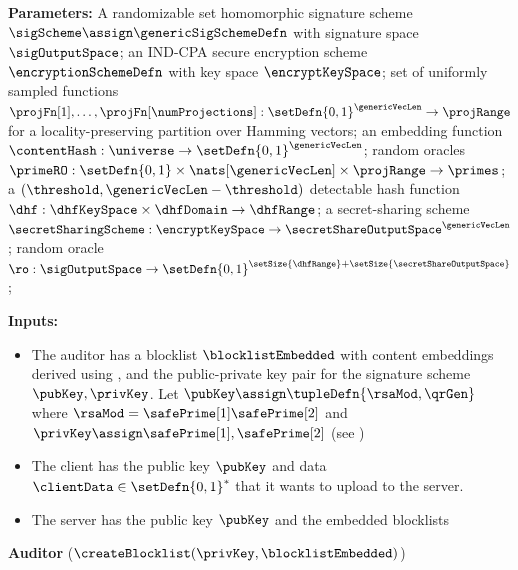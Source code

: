 \begin{mdframed}[frametitle={Protocol for Detecting Fuzzy Blocklist Matches}, 
frametitlealignment=\centering, 
font=\small]

	\smallskip\noindent\textbf{Parameters:} A randomizable set homomorphic signature 
	scheme 
$\sigScheme \assign \genericSigSchemeDefn$ with signature space $\sigOutputSpace$; an 
IND-CPA secure encryption scheme $\encryptionSchemeDefn$ with key space 
$\encryptKeySpace$; set of uniformly sampled functions $\projFn[1], \dots, 
\projFn[\numProjections]: \setDefn{0,1}^{\genericVecLen} \rightarrow \projRange$ for a 
locality-preserving partition over Hamming vectors; an embedding function 
$\contentHash: \universe \rightarrow \setDefn{0,1}^{\genericVecLen}$; 
random oracles $\primeRO: 
\setDefn{0,1} \times \nats[\genericVecLen] \times \projRange \rightarrow \primes$;  
a $(\threshold, \genericVecLen - \threshold)$ detectable hash 
function $\dhf: \dhfKeySpace \times \dhfDomain \rightarrow \dhfRange$;
a secret-sharing scheme $\secretSharingScheme: \encryptKeySpace \rightarrow 
\secretShareOutputSpace^{\genericVecLen}$; random oracle $\ro: 
\sigOutputSpace \rightarrow \setDefn{0,1}^{\setSize{\dhfRange} + 
	\setSize{\secretShareOutputSpace}}$;

\smallskip\noindent\textbf{Inputs:}


\begin{itemize}[leftmargin=0.5em]
\item The auditor \auditor has a blocklist $\blocklistEmbedded$ with \blocklistSize content 
embeddings derived using \contentHash, 
and the public-private key pair for the signature scheme $\pubKey, \privKey$. Let $\pubKey 
\assign \tupleDefn{\rsaMod, \qrGen}$ where $\rsaMod = 
\safePrime[1]  \safePrime[2]$ and $\privKey \assign \safePrime[1], \safePrime[2]$ (see 
)

\item The client \client has the public key $\pubKey$ and data $\clientData \in 
\setDefn{0,1}^{\ast}$ that it wants to upload to the server. 

\item The server \server has the public key $\pubKey$ and the embedded blocklists 
\end{itemize}	

\smallskip\noindent\textbf{Auditor} ($\createBlocklist(\privKey, \blocklistEmbedded)$)
%


\begin{enumerate}[leftmargin=1.5em]


\end{enumerate}
\end{mdframed}
